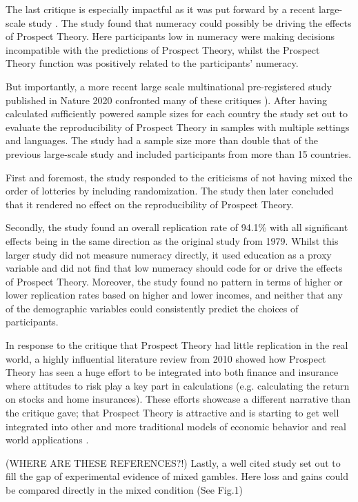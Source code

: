 \documentclass{article}
\begin{document}
The last critique is especially impactful as it was put forward by a recent large-scale study \cite{millroth2019jdm}. The study found that numeracy could possibly be driving the effects of Prospect Theory. Here participants low in numeracy were making decisions incompatible with the predictions of Prospect Theory, whilst the Prospect Theory function was positively related to the participants' numeracy.

But importantly, a more recent large scale multinational pre-registered study published in Nature 2020 confronted many of these critiques \cite{ruggeri2020nhba}). After having calculated sufficiently powered sample sizes for each country the study set out to evaluate the reproducibility of Prospect Theory in samples with multiple settings and languages. The study had a sample size more than double that of the previous large-scale study and included participants from more than 15 countries. 

First and foremost, the study responded to the criticisms of not having mixed the order of lotteries by including randomization. The study then later concluded that it rendered no effect on the reproducibility of Prospect Theory.

Secondly, the study found an overall replication rate of 94.1\% with all significant effects being in the same direction as the original study from 1979. Whilst this larger study did not measure numeracy directly, it used education as a proxy variable and did not find that low numeracy should code for or drive the effects of Prospect Theory. Moreover, the study found no pattern in terms of higher or lower replication rates based on higher and lower incomes, and neither that any of the demographic variables could consistently predict the choices of participants. 

In response to the critique that Prospect Theory had little replication in the real world, a highly influential literature review from 2010 showed how Prospect Theory has seen a huge effort to be integrated into both finance and insurance where attitudes to risk play a key part in calculations (e.g. calculating the return on stocks and home insurances).
These efforts showcase a different narrative than the critique gave; that Prospect Theory is attractive and is starting to get well integrated into other and more traditional models of economic behavior and real world applications \cite{barberis2013jep}. 

(WHERE ARE THESE REFERENCES?!) Lastly, a well cited study set out to fill the gap of experimental evidence of mixed gambles. Here loss and gains could be compared directly in the mixed condition (See Fig.1)
\end{document}
